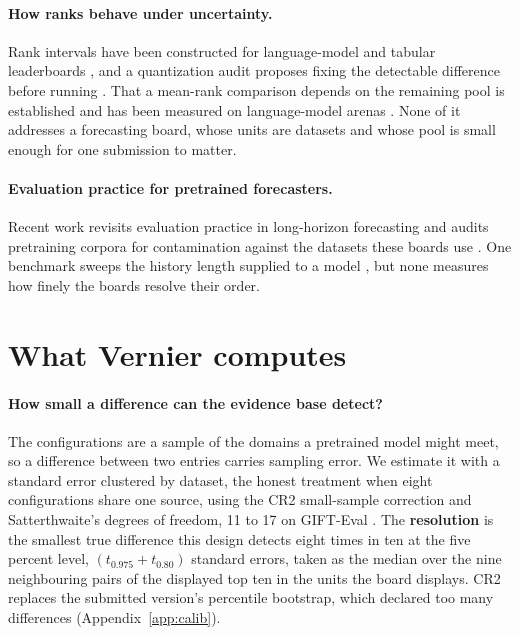 \documentclass{article}
\begin{document}
\paragraph{How ranks behave under uncertainty.} Rank intervals have been constructed for
language-model and tabular leaderboards \citep{rankint1, rankint2}, and a quantization audit
proposes fixing the detectable difference before running \citep{pairedmde}. That a mean-rank
comparison depends on the remaining pool is established \citep{benavoli2016, zhanghardt2024}
and has been measured on language-model arenas \citep{arenaperturb}. None of it addresses a
forecasting board, whose units are datasets and whose pool is small enough for one submission
to matter.

\paragraph{Evaluation practice for pretrained forecasters.} Recent work revisits evaluation
practice in long-horizon forecasting \citep{positionpaper} and audits pretraining corpora for
contamination against the datasets these boards use \citep{tsfmaudit}. One benchmark sweeps
the history length supplied to a model \citep{tsfmbench}, but none measures how finely the
boards resolve their order.

\section{What Vernier computes}
\label{sec:vernier}

\paragraph{How small a difference can the evidence base detect?} The configurations are a
sample of the domains a pretrained model might meet, so a difference between two entries
carries sampling error. We estimate it with a standard error clustered by dataset, the honest
treatment when eight configurations share one source, using the CR2 small-sample correction
and Satterthwaite's degrees of freedom, 11 to 17 on GIFT-Eval
\citep{bellmccaffrey2002, imbenskolesar2016}. The \textbf{resolution} is the smallest true
difference this design detects eight times in ten at the five percent level, $(t_{0.975} +
t_{0.80})$ standard errors, taken as the median over the nine neighbouring pairs of the
displayed top ten in the units the board displays. CR2 replaces the submitted version's
percentile bootstrap, which declared too many differences (Appendix~\ref{app:calib}).
\end{document}
